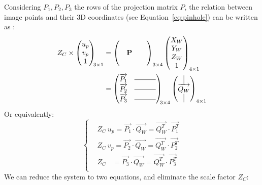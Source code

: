 Considering $P_1, P_2, P_3$ the rows of the projection matrix $P$, the relation between image points and their 3D coordinates (see Equation~\ref{eq:pinhole}) can be written as \cite{Hartley2003} :
\begin{equation}\label{eq:calib_system}
  \begin{aligned}
    Z_C \times \begin{pmatrix}u_p\\v_p\\1 \end{pmatrix}_{\!\!3\times 1} 
    &= \begin{pmatrix}&&&\\&\textbf{P}&\\&&& \end{pmatrix}_{3 \times 4} 
    \begin{pmatrix} X_W \\ Y_W \\ Z_W \\ 1 \end{pmatrix}_{4\times 1}\\
    &= \begin{pmatrix}\overrightarrow{P_1} & \rule[.5ex]{3.em}{0.4pt}\\   
      \overrightarrow{P_2} &\rule[.5ex]{3.em}{0.4pt} \\ 
      \overrightarrow{P_3} &\rule[.5ex]{3.em}{0.4pt}\end{pmatrix}_{\!\!3\times 4}
      \begin{pmatrix} \vline \\ \overrightarrow{Q_W} \\ \vline \end{pmatrix}_{4\times 1}
  \end{aligned}
  \end{equation}
  Or equivalently:
  \begin{equation}
    \begin{cases}
      & Z_C \ u_p = \overrightarrow{P_1} \cdot \overrightarrow{Q_W} = \overrightarrow{Q_W^T} \cdot \overrightarrow{P_1^T}\\
      & Z_C \ v_p = \overrightarrow{P_2} \cdot \overrightarrow{Q_W} = \overrightarrow{Q_W^T} \cdot \overrightarrow{P_2^T}\\
      & Z_C \ \ \ \ = \overrightarrow{P_3} \cdot \overrightarrow{Q_W} = \overrightarrow{Q_W^T} \cdot \overrightarrow{P_3^T}\\
    \end{cases}
  \end{equation}
  We can reduce the system to two equations, and eliminate the scale factor $Z_C$:
